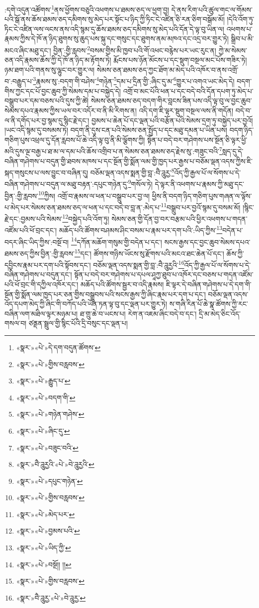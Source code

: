 :དགེ་འདུན་འཚོགས་\footnote{«སྣར་»«པེ་»དེ་དག་བདུན་ཚོགས་}ནས་ཕྱོགས་བཅུའི་འཕགས་པ་ཐམས་ཅད་ལ་ཕྱག་བྱ། དེ་ནས་རིག་པའི་ཚུལ་གང་ལ་གོམས་པའི་སྒོ་ནས་ཆོས་ཐམས་ཅད་དམིགས་སུ་མེད་པར་སྟོང་པ་ཉིད་ཀྱི་ཏིང་ངེ་འཛིན་ཅི་རན་ཅིག་བསྒོམ་མོ། །དེའི་འོག་ཏུ་ཏིང་ངེ་འཛིན་ལས་ལངས་ནས་འདི་སྙམ་དུ་ཆོས་ཐམས་ཅད་དམིགས་སུ་མེད་པའི་དོན་དེ་ལྟ་བུ་ཡིན་ལ། འཕགས་པ་རྣམས་ཀྱིས་དེ་ཁོ་ན་ཉིད་ཐུགས་སུ་ཆུད་པས་སྐུ་དང་གསུང་དང་ཐུགས་ནམ་མཁའ་དང་འདྲ་བར་གྱུར་ཏེ། སྒྲིབ་པ་མི་མངའ་ཞིང་མཐུ་དང་། བྱིན་:གྱི་རླབས་\footnote{«སྣར་»«པེ་»གྱིས་བརླབས་}བསམ་གྱིས་མི་ཁྱབ་པའི་གོ་འཕང་བརྙེས་པར་ཡང་རུང་ན། ཀྱེ་མ་སེམས་ཅན་འདི་རྣམས་ཆོས་ཀྱི་དེ་ཁོ་ན་ཉིད་མ་རྟོགས་ཏེ། རྨོངས་པས་ཉོན་མོངས་པ་དང་སྡུག་བསྔལ་མང་པོས་གཟིར་ཏེ། ཉམ་ཐག་པའི་གནས་སུ་ལྷུང་བར་གྱུར་ལ། སེམས་ཅན་ཐམས་ཅད་ཀྱང་ཐོག་མ་མེད་པའི་འཁོར་བ་ནས་འགྲོ་བ་:བརྒྱུད་པ་\footnote{«སྣར་»«པེ་»རྒྱུད་པ་}རྣམས་སུ་:བདག་གི་བཤེས་\footnote{«སྣར་»«པེ་»བདག་གི་}གཉེན་\footnote{«སྣར་»«པེ་»གཉེན་གཤེས་}དམ་པ་དྲིན་གྱི་:ཞིང་དུ་མ་\footnote{«སྣར་»«པེ་»ཞིང་དུ་}གྱུར་པ་འགའ་ཡང་མེད་དེ། བདག་གིས་ཀྱང་དང་པོ་བྱང་ཆུབ་ཀྱི་སེམས་དམ་པ་བསྐྱེད་དེ། འགྲོ་བ་མང་པོའི་ཕན་པ་དང་བདེ་བའི་དོན་དཔག་ཏུ་མེད་པ་བསྒྲུབ་པར་དམ་བཅས་པའི་དུས་ཀྱི་ཚེ། སེམས་ཅན་ཐམས་ཅད་བདག་གིར་བླངས་ཟིན་པས་འདི་ལྟ་བུ་ལ་བྱང་ཆུབ་སེམས་དཔའ་རྣམས་ཀྱིས་ཡལ་བར་འདོར་བ་ནི་མི་རིགས་ན། འདི་དག་ཇི་ལྟར་སྡུག་བསྔལ་ལས་ནི་གདོན། བདེ་བ་ལ་ནི་དགོད་པར་བྱ་སྙམ་དུ་སྙིང་རྗེ་དང་། བྱམས་པ་ཆེན་པོ་དང་ལྡན་པའི་བརྩོན་པའི་སེམས་དྲག་ཏུ་བསྐྱེད་པར་བྱའོ། །ཡང་འདི་སྙམ་དུ་བསམས་ཏེ། བདག་ནི་དུས་ངན་པའི་སེམས་ཅན་སྤྱོད་པ་དང་མཐུ་དམན་པ་ཡིན་པས། བདག་ཉིད་གཅིག་པུས་འཕྲལ་དུ་དོན་རླབས་པོ་ཆེ་འདི་ལྟ་བུ་ནི་མི་ལྕོགས་ཀྱི། སྟོན་པ་བདེ་བར་གཤེགས་པས་སྔོན་ཅི་ལྟར་ཕྱི་མའི་དུས་ལྔ་བརྒྱ་པ་ཐ་མ་ལ་དམ་པའི་ཆོས་འགྲིབ་པ་ན་སེམས་ཅན་ཐམས་ཅད་རྗེས་སུ་:གཟུང་བའི་\footnote{«སྣར་»«པེ་»བཟུང་བའི་}སླད་དུ་དེ་བཞིན་གཤེགས་པ་བདུན་གྱི་ཐབས་མཁས་པ་དང་སྔོན་གྱི་སྨོན་ལམ་གྱི་ཁྱད་པར་རྒྱས་པ་བཅོམ་ལྡན་འདས་ཀྱིས་ཇི་སྐད་གསུངས་པ་ལས་བྱུང་བ་བཞིན་དུ། བཅོམ་ལྡན་འདས་སྨན་གྱི་བླ་:བཻ་ཌཱུརྱ་\footnote{«སྣར་»བཻ་ཌཱུརྱའི་«པེ་»བེ་ཌཱུརྱའི་}འོད་ཀྱི་རྒྱལ་པོ་ལ་སོགས་པ་དེ་བཞིན་གཤེགས་པ་བདུན་ལ་མཐུ་བརྟན་:དཔུང་གཉེན་དུ་\footnote{«སྣར་»«པེ་»དཔུང་གཉེན་}གསོལ་ཏེ། དེ་ལྟར་ནི་འཕགས་པ་རྣམས་ཀྱི་མཐུ་དང་བྱིན་:གྱི་རླབས་\footnote{«སྣར་»«པེ་»གྱིས་བརླབས་}ཀྱིས། འགྲོ་བ་རྣམས་ལ་ཕན་པ་བསྒྲུབ་པར་བྱ་ལ། ཕྱིས་ནི་བདག་ཉིད་གཅིག་པུས་གཞན་ལ་ལྟོས་པ་མེད་པར་སེམས་ཅན་ཐམས་ཅད་ལ་ཕན་པ་དང་བདེ་བ་བླ་ན་:མེད་པ་\footnote{«སྣར་»«པེ་»མེད་པར་}བསྒྲུབ་པར་བྱའོ་སྙམ་དུ་བསམ་མོ། །སྙིང་རྗེ་དང་:བྱམས་པའི་སེམས་\footnote{«སྣར་»«པེ་»བྱམས་པའི་}བསྐྱེད་པའི་འོག་ཏུ། སེམས་ཅན་གྱི་དོན་བྱ་བར་བརྩམ་པའི་ཕྱིར་འཕགས་པ་གདན་འཛོམ་པའི་ཕོ་བྲང་དང་། མཆོད་པའི་ཚོགས་བཤམས་ཤིང་བསམ་པ་རྣམ་པར་དག་པའི་:ཡིད་ཀྱིས་\footnote{«སྣར་»«པེ་»ཡིད་ཀྱི་}བདེན་པ་བདར་ཞིང་ཡིད་ཀྱིས་:བསྔོ་བ། \footnote{«སྣར་»«པེ་»བསྔོ།། །། }དཀོན་མཆོག་གསུམ་གྱི་བདེན་པ་དང་། སངས་རྒྱས་དང་བྱང་ཆུབ་སེམས་དཔའ་ཐམས་ཅད་ཀྱིས་བྱིན་:གྱི་རླབས་\footnote{«སྣར་»«པེ་»གྱིས་བརླབས་}དང་། ཚོགས་གཉིས་ཡོངས་སུ་རྫོགས་པའི་མངའ་ཐང་ཆེན་པོ་དང་། ཆོས་ཀྱི་དབྱིངས་རྣམ་པར་དག་པའི་སྟོབས་དང་། བཅོམ་ལྡན་འདས་སྨན་གྱི་བླ་:བཻ་ཌཱུརྱའི་\footnote{«སྣར་»བཻ་ཌཱུརྱ་«པེ་»བེ་ཌཱུརྱ་}འོད་ཀྱི་རྒྱལ་པོ་ལ་སོགས་པ་དེ་བཞིན་གཤེགས་པ་བདུན་དང་། སྟོན་པ་བདེ་བར་གཤེགས་པ་དཔལ་ཤཱཀྱ་ཐུབ་པ་འཁོར་དང་བཅས་པ་གདན་འཛོམ་པའི་ཕོ་བྲང་གི་དཀྱིལ་འཁོར་དང་། མཆོད་པའི་ཚོགས་སྦྱར་བ་འདི་རྣམས། ཇི་ལྟར་དེ་བཞིན་གཤེགས་པ་དེ་དག་གི་སྔོན་གྱི་སྨོན་ལམ་ཁྱད་པར་ཅན་གྱིས་བསྒྲུབས་པའི་སངས་རྒྱས་ཀྱི་ཞིང་རྣམ་པར་དག་པ་དང་། བཅོམ་ལྡན་འདས་འོད་དཔག་མེད་ཀྱི་ཞིང་གི་བཀོད་པའི་ཡོན་ཏན་ལྟ་བུ་དང་ལྡན་པར་གྱུར་ཏེ། ས་གཞི་རིན་པོ་ཆེ་སྣ་ཚོགས་ཀྱི་རང་བཞིན་ལག་མཐིལ་ལྟར་མཉམ་པ། ཐ་གྲུ་ཆེ་བ་ཡངས་པ། རེག་ན་འཇམ་ཞིང་བདེ་བ་དང་། དྲི་མ་མེད་ཅིང་འོད་གསལ་བ། ཙནྡན་སྦྲུལ་གྱི་སྙིང་པོའི་དྲི་བསུང་དང་ལྡན་པ། 